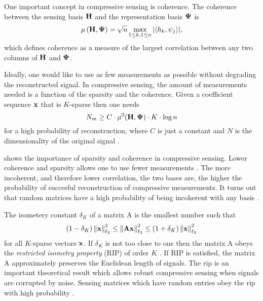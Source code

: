 One important concept in \gls{compressive sensing} is coherence. The coherence between the sensing basis $\displaystyle \mathbf{H}$ and the representation basis $\displaystyle \mathbf{\Psi}$ is
\begin{equation}
	\mu \left( \displaystyle \mathbf{H}, \displaystyle \mathbf{\Psi} \right) = \sqrt{n} \max_{1 \leq k, 1 \leq n}  | \langle h_k, \psi_j \rangle | ,
	\label{eq:coherenceDef1}
\end{equation}
which defines coherence as a measure of the largest correlation between any two columns of $\displaystyle \mathbf{H}$ and $\displaystyle \mathbf{\Psi}$. 

Ideally, one would like to use as few measurements as possible without degrading the reconstructed signal. In \gls{compressive sensing}, the amount of measurements needed is a function of the sparsity and the coherence. Given a coefficient sequence $\displaystyle \mathbf{x}$ that is $K$-sparse then one needs
\begin{equation}
N_m \geq C \cdot \mu^2 ( \displaystyle \mathbf{H} , \displaystyle \mathbf{\Psi} ) \cdot K \cdot \log n
\label{eq:minMeas1}
\end{equation}
for a high probability of reconstruction, where $C$ is just a constant and $N$ is the dimensionality of the original signal \cite{candes2008introduction}.

 shows the importance of sparsity and coherence in compressive sensing. Lower coherence and sparsity allows one to use fewer measurements \cite{duarte2008single}. The more incoherent, and therefore lower correlation, the two bases are, the higher the probability of succesful reconstruction of compressive measurements. It turns out that random matrices have a high probability of being incoherent with any basis \cite{candes2008introduction}. 

The isometery constant $\delta_K$ of a matrix \gls{A} is the smallest number such that 
\begin{equation}
	\left( 1 - \delta_K \right) \left\| \displaystyle \mathbf{x} \right\|_{\ell_2}^{2} \leq \left\| \displaystyle \mathbf{A} \displaystyle \mathbf{x} \right\|_{\ell_2}^{2} \leq \left( 1 + \delta_K \right) \left\| \displaystyle \mathbf{x} \right\|_{\ell_2}^{2} 
\label{eq:rip}
\end{equation}
for all $K$-sparse vectors $\displaystyle \mathbf{x}$. If $\delta_K$ is not too close to one then the matrix \gls{A} obeys the \emph{restricted isometry property} (RIP) of order $K$ \cite{candes2008introduction}. If RIP is satisfied, the matrix \gls{A} approximately preserves the Euclidean length of signals. The \gls{rip} is an important theoretical result which allows robust compressive sensing when signals are corrupted by noise. Sensing matrices which have random entries obey the \gls{rip} with high probability \cite{candes2008introduction, duarte2008single, foucart2013mathematical}. 

